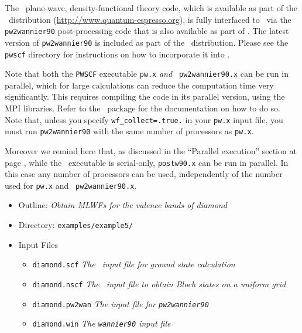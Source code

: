 \documentclass[a4paper,11pt,twoside]{article}
\begin{document}
\clearpage

\label{sec:using pwscf}

The \pwscf\ plane-wave, density-functional theory code, which is
available as part of the \QE\ distribution (\url{http://www.quantum-espresso.org}), is fully interfaced to \wannier\ via the
{\tt pw2wannier90} post-processing code that is also available as part
of \QE. The latest version of {\tt pw2wannier90} is included as part of 
the \wannier\ distribution. Please see the {\tt pwscf} directory for 
instructions on how to incorporate it into \pwscf. 

Note that both the {\tt PWSCF} executable {\tt pw.x} {\it and} {\tt
  pw2wannier90.x} can be run in parallel, which for large calculations
can reduce the computation time very significantly.  This requires
compiling the code in its parallel version, using the MPI
libraries. Refer to the \QE\ package for the documentation on how to
do so.  Note that, unless you specify {\tt wf\_collect=.true.} in your
{\tt pw.x} input file, you must run {\tt pw2wannier90} with the same
number of processors as {\tt pw.x}.

Moreover we remind here that, as discussed in the ``Parallel
execution'' section at page \pageref{sec:parallel}, while the
\wannier\ executable is serial-only, {\tt postw90.x} can be run in
parallel. In this case any number of processors can be used,
independently of the number used for {\tt pw.x} and {\tt
  pw2wannier90.x}.


\begin{itemize}
\item{Outline: \it{Obtain MLWFs for the valence bands of diamond}}
\item{Directory: {\tt examples/example5/}}
\item{Input Files}
\begin{itemize}
\item{ {\tt diamond.scf}  {\it The \pwscf\ input file for ground state
    calculation}} 
\item{ {\tt diamond.nscf}  {\it The \pwscf\ input file to obtain Bloch
    states on a uniform grid}} 
\item{ {\tt diamond.pw2wan}  {\it The input file for {\tt pw2wannier90}}}
\item{ {\tt diamond.win}  {\it The {\tt wannier90} input file}}
\end{itemize}
\end{itemize}
\end{document}
